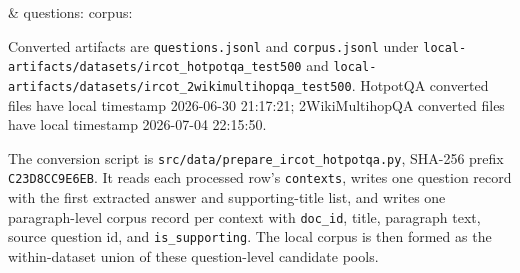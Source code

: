 \begin{table}
\begin{tabularx}{\dimexpr\textheight-8pt\relax}
 &
questions:
corpus:
 \\
\bottomrule
\end{tabularx}
\begin{tablenotes}
\footnotesize
\item Converted artifacts are \texttt{questions.jsonl} and \texttt{corpus.jsonl} under \texttt{local-artifacts/datasets/ircot\_hotpotqa\_test500} and \texttt{local-artifacts/datasets/ircot\_2wikimultihopqa\_test500}. HotpotQA converted files have local timestamp 2026-06-30 21:17:21; 2WikiMultihopQA converted files have local timestamp 2026-07-04 22:15:50.
\item The conversion script is \texttt{src/data/prepare\_ircot\_hotpotqa.py}, SHA-256 prefix \texttt{C23D8CC9E6EB}. It reads each processed row's \texttt{contexts}, writes one question record with the first extracted answer and supporting-title list, and writes one paragraph-level corpus record per context with \texttt{doc\_id}, title, paragraph text, source question id, and \texttt{is\_supporting}. The local corpus is then formed as the within-dataset union of these question-level candidate pools.
\end{tablenotes}
\end{table}

